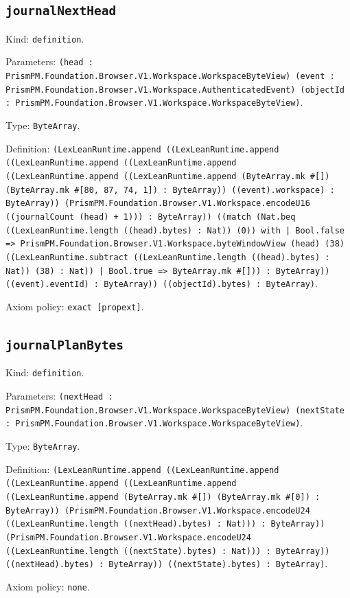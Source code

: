 \documentclass[11pt]{article}
\begin{document}
\subsection*{\texttt{journalNextHead}}
\noindent Kind: \texttt{definition}.\par
\noindent Parameters: \texttt{(head : PrismPM.Foundation.Browser.V1.Workspace.WorkspaceByteView) (event : PrismPM.Foundation.Browser.V1.Workspace.AuthenticatedEvent) (objectId : PrismPM.Foundation.Browser.V1.Workspace.WorkspaceByteView)}.\par
\noindent Type: \texttt{ByteArray}.\par
\noindent Definition: \texttt{(LexLeanRuntime.append ((LexLeanRuntime.append ((LexLeanRuntime.append ((LexLeanRuntime.append ((LexLeanRuntime.append ((LexLeanRuntime.append (ByteArray.mk \#[]) (ByteArray.mk \#[80, 87, 74, 1]) : ByteArray)) ((event).workspace) : ByteArray)) (PrismPM.Foundation.Browser.V1.Workspace.encodeU16 ((journalCount (head) + 1))) : ByteArray)) ((match (Nat.beq ((LexLeanRuntime.length ((head).bytes) : Nat)) (0)) with | Bool.false => PrismPM.Foundation.Browser.V1.Workspace.byteWindowView (head) (38) ((LexLeanRuntime.subtract ((LexLeanRuntime.length ((head).bytes) : Nat)) (38) : Nat)) | Bool.true => ByteArray.mk \#[])) : ByteArray)) ((event).eventId) : ByteArray)) ((objectId).bytes) : ByteArray)}.\par
\noindent Axiom policy: \texttt{exact [propext]}.\par
\subsection*{\texttt{journalPlanBytes}}
\noindent Kind: \texttt{definition}.\par
\noindent Parameters: \texttt{(nextHead : PrismPM.Foundation.Browser.V1.Workspace.WorkspaceByteView) (nextState : PrismPM.Foundation.Browser.V1.Workspace.WorkspaceByteView)}.\par
\noindent Type: \texttt{ByteArray}.\par
\noindent Definition: \texttt{(LexLeanRuntime.append ((LexLeanRuntime.append ((LexLeanRuntime.append ((LexLeanRuntime.append ((LexLeanRuntime.append (ByteArray.mk \#[]) (ByteArray.mk \#[0]) : ByteArray)) (PrismPM.Foundation.Browser.V1.Workspace.encodeU24 ((LexLeanRuntime.length ((nextHead).bytes) : Nat))) : ByteArray)) (PrismPM.Foundation.Browser.V1.Workspace.encodeU24 ((LexLeanRuntime.length ((nextState).bytes) : Nat))) : ByteArray)) ((nextHead).bytes) : ByteArray)) ((nextState).bytes) : ByteArray)}.\par
\noindent Axiom policy: \texttt{none}.\par
\end{document}
